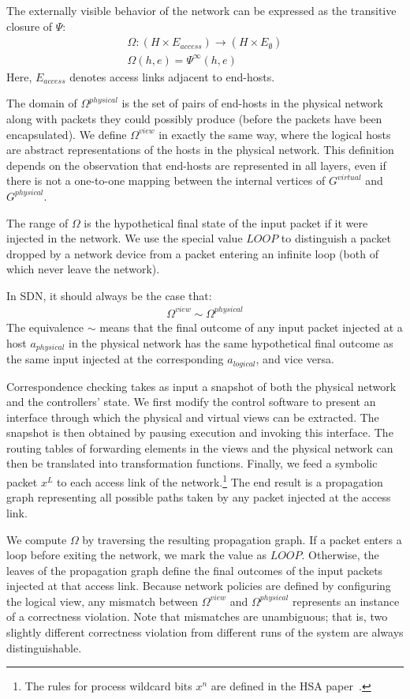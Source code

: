 The externally visible behavior of the network can be expressed as the
transitive closure of $\Psi$:
\begin{align*}
\Omega: (H \times E_{access}) \rightarrow (H \times E_{\emptyset}) \\
\Omega(h,e) = \Psi^{\infty}(h,e)
\end{align*}
Here, $E_{access}$ denotes access links adjacent to end-hosts.

The domain of $\Omega^{physical}$ is the set of pairs of end-hosts in the
physical network along with packets they could possibly produce (before
the packets have been encapsulated). We define $\Omega^{view}$ in exactly the same way, where
the logical hosts are abstract representations of the hosts in the physical
network. This definition depends on the observation that end-hosts are represented
in all layers, even if there is not a one-to-one mapping between the
internal vertices of $G^{virtual}$ and $G^{physical}$.

The range of $\Omega$ is the hypothetical final state of the
input packet if it were injected in the network.
We use the special value $LOOP$ to distinguish
a packet dropped by a network device from a packet entering an
infinite loop (both of which never leave the network).

In SDN, it should always be the case that:
\begin{align*}
\Omega^{view} \sim \Omega^{physical}
\end{align*}
The equivalence $\sim$ means that the final outcome of any input packet
injected at a host $a_{physical}$ in the physical network has the same hypothetical final outcome as
the same input injected at the corresponding $a_{logical}$, and vice versa.

Correspondence checking takes as input a
snapshot of both the physical network and the
controllers' state. We first modify the control software to present an
interface through which the physical and virtual views can be
extracted. The snapshot is
then obtained by pausing execution and invoking this interface.
The routing tables of forwarding elements in the views and the physical
network can then be translated into transformation functions.
Finally, we feed a symbolic packet $x^L$ to each access link of the
network.\footnote{The rules for process wildcard bits $x^n$ are defined in
the HSA paper~\cite{hsa}.} The end result is a propagation graph representing
all possible paths taken by any packet injected
at the access link.

We compute $\Omega$ by traversing the resulting propagation graph. If a packet
enters a loop before exiting the network, we mark the value as
$LOOP$. Otherwise,
the leaves of the propagation graph define the final outcomes of the input
packets injected at that access link. Because network policies are defined by
configuring the logical view, any mismatch between $\Omega^{view}$ and $\Omega^{physical}$
represents an instance of a correctness violation. Note that mismatches are
unambiguous; that is, two slightly different correctness violation from
different runs of the system are always distinguishable.

